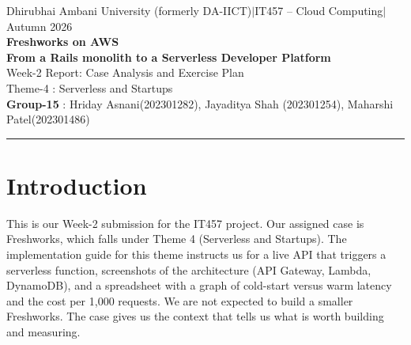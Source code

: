 \documentclass[10pt,a4paper]{article}
\begin{document}
\begin{center}
{\small Dhirubhai Ambani University (formerly DA-IICT)\quad$|$\quad IT457 -- Cloud Computing\quad$|$\quad Autumn 2026}\\[6pt]
{\LARGE\bfseries Freshworks on AWS}\\[2pt]
{\large\bfseries From a Rails monolith to a Serverless Developer Platform}\\[3pt]
{\normalsize Week-2 Report: Case Analysis and Exercise Plan}\\[2pt]
{\small Theme-4 : Serverless and Startups}\\[2pt]
{\normalsize \textbf{Group-15} : Hriday Asnani(202301282), Jayaditya Shah (202301254), Maharshi Patel(202301486)}
\end{center}
\vspace{-4pt}
\hrule
\vspace{6pt}

\begin{abstract}
\noindent This report analyses how Freshworks, a SaaS company that started in Chennai in 2010, runs and scales on AWS, and uses that analysis to plan our hands-on exercise. We read the company's engineering posts, two AWS case studies, SEC filings and recent earnings material. Most of Freshworks' main product is a conventional Rails application on load balancers and managed databases, and its problems are mostly about protecting shared capacity from slow requests and noisy tenants. Serverless appears in one specific place: the Neo developer platform, where every marketplace app runs as an AWS Lambda function. We therefore build a small serverless proof of concept (API Gateway, Lambda, DynamoDB) in the \texttt{ap-south-1} region and measure cold starts, warm latency and cost per 1{,}000 requests. The report also gives the architecture diagrams, the problem--solution analysis, the experiment design and the division of work between the three of us.
\end{abstract}

\section{Introduction}

This is our Week-2 submission for the IT457 project. Our assigned case is Freshworks, which falls under Theme 4 (Serverless and Startups). The implementation guide for this theme instructs us for a live API that triggers a serverless function, screenshots of the architecture (API Gateway, Lambda, DynamoDB), and a spreadsheet with a graph of cold-start versus warm latency and the cost per 1{,}000 requests. We are not expected to build a smaller Freshworks. The case gives us the context that tells us what is worth building and measuring.
\end{document}
